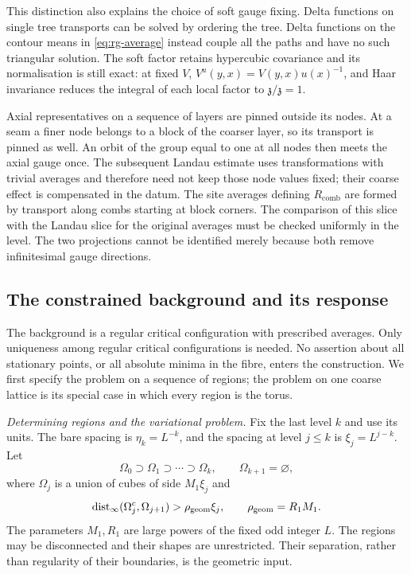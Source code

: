 \documentclass[11pt,letterpaper,reqno]{amsart}
\theoremstyle{definition}
\theoremstyle{remark}
\begin{document}
This distinction also explains the choice of soft
gauge fixing. Delta functions on single tree
transports can be solved by ordering the tree.
Delta functions on the contour means in
\eqref{eq:rg-average} instead couple all the paths
and have no such triangular solution. The soft
factor retains hypercubic covariance and its
normalisation is still exact: at fixed $V$,
$V^u(y,x)=V(y,x)u(x)^{-1}$, and Haar invariance
reduces the integral of each local factor to
$\mathfrak z/\mathfrak z=1$.

Axial representatives on a sequence of layers
are pinned outside its nodes. At a seam a finer
node belongs to a block of the coarser layer, so
its transport is pinned as well. An orbit of the
group equal to one at all nodes then meets the
axial gauge once. The subsequent Landau estimate
uses transformations with trivial averages and
therefore need not keep those node values fixed;
their coarse effect is compensated in the datum.
The site averages defining $R_{\mathrm{comb}}$ are formed by
transport along combs starting at block corners. The comparison
of this slice with the Landau slice for the original averages must
be checked uniformly in the level. The two projections cannot
be identified merely because both remove infinitesimal gauge directions.

\subsection{The constrained background and its response}

The background is a regular critical configuration with prescribed
averages. Only uniqueness among regular critical configurations is
needed. No assertion about all stationary points, or all absolute
minima in the fibre, enters the construction. We first specify the
problem on a sequence of regions; the problem on one coarse lattice
is its special case in which every region is the torus.

\emph{Determining regions and the variational problem.}
Fix the last level $k$ and use its units. The bare spacing is
$\eta_k=L^{-k}$, and the spacing at level $j\le k$ is
$\xi_j=L^{j-k}$. Let
\[
 \Omega_0\supset\Omega_1\supset\cdots\supset\Omega_k,
 \qquad \Omega_{k+1}=\varnothing,
\]
where $\Omega_j$ is a union of cubes of side $M_1\xi_j$ and
\[
 \operatorname{dist}_\infty(\Omega_j^c,\Omega_{j+1})
       >\rho_{\rm geom}\xi_j,\qquad \rho_{\rm geom}=R_1M_1.
\]
The parameters $M_1,R_1$ are large powers of the fixed odd
integer $L$. The regions may be disconnected and their shapes
are unrestricted. Their separation, rather than regularity of
their boundaries, is the geometric input.
\end{document}
